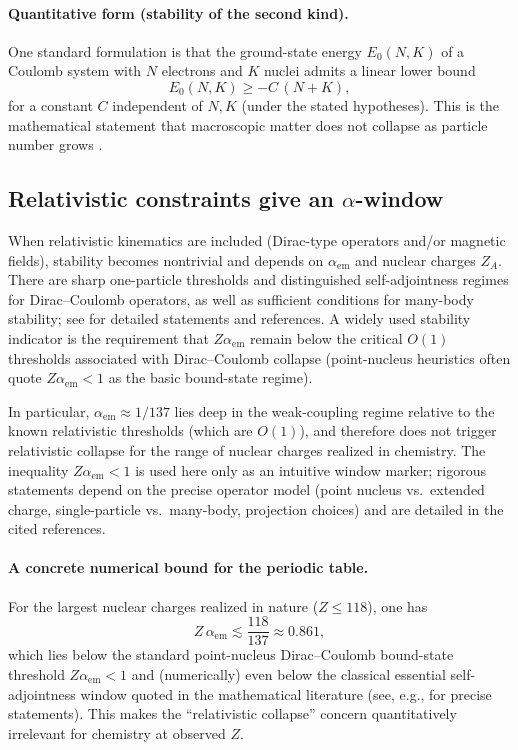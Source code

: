 \paragraph{Quantitative form (stability of the second kind).}
One standard formulation is that the ground-state energy $E_0(N,K)$ of a Coulomb system with $N$ electrons and $K$ nuclei admits a linear lower bound
\begin{equation}
E_0(N,K)\ge -C\,(N+K),
\end{equation}
for a constant $C$ independent of $N,K$ (under the stated hypotheses). This is the mathematical statement that macroscopic matter does not collapse as particle number grows \cite{LiebSeiringer2010}.

\subsection{Relativistic constraints give an \texorpdfstring{$\alpha$}{alpha}-window}
When relativistic kinematics are included (Dirac-type operators and/or magnetic fields), stability becomes nontrivial and depends on $\alpha_{\mathrm{em}}$ and nuclear charges $Z_A$. There are sharp one-particle thresholds and distinguished self-adjointness regimes for Dirac--Coulomb operators, as well as sufficient conditions for many-body stability; see \cite{Thaller1992,Thirring2002,LiebSeiringer2010} for detailed statements and references. A widely used stability indicator is the requirement that $Z\alpha_{\mathrm{em}}$ remain below the critical $O(1)$ thresholds associated with Dirac--Coulomb collapse (point-nucleus heuristics often quote $Z\alpha_{\mathrm{em}}<1$ as the basic bound-state regime).

In particular, $\alpha_{\mathrm{em}}\approx 1/137$ lies deep in the weak-coupling regime relative to the known relativistic thresholds (which are $O(1)$), and therefore does not trigger relativistic collapse for the range of nuclear charges realized in chemistry. The inequality $Z\alpha_{\mathrm{em}}<1$ is used here only as an intuitive window marker; rigorous statements depend on the precise operator model (point nucleus vs.\ extended charge, single-particle vs.\ many-body, projection choices) and are detailed in the cited references.

\paragraph{A concrete numerical bound for the periodic table.}
For the largest nuclear charges realized in nature ($Z\le 118$), one has
\[
Z\,\alpha_{\mathrm{em}}\lesssim \frac{118}{137}\approx 0.861,
\]
which lies below the standard point-nucleus Dirac--Coulomb bound-state threshold $Z\alpha_{\mathrm{em}}<1$ and (numerically) even below the classical essential self-adjointness window quoted in the mathematical literature (see, e.g., \cite{Thaller1992} for precise statements). This makes the ``relativistic collapse'' concern quantitatively irrelevant for chemistry at observed $Z$.

